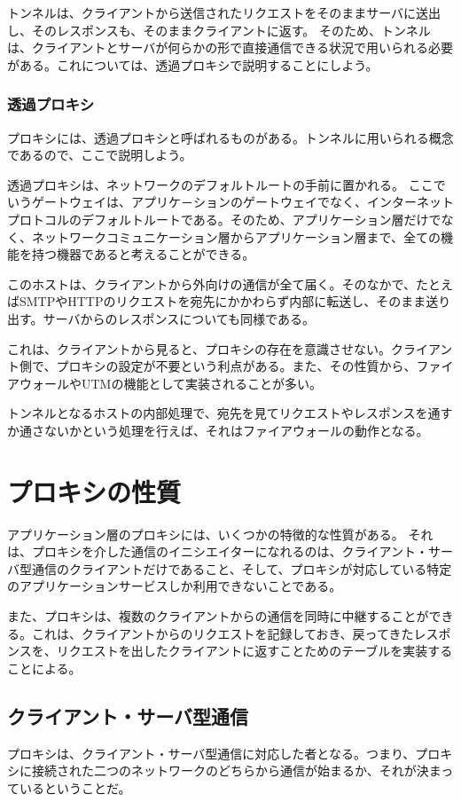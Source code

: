 トンネルは、クライアントから送信されたリクエストをそのままサーバに送出し、そのレスポンスも、そのままクライアントに返す。
そのため、トンネルは、クライアントとサーバが何らかの形で直接通信できる状況で用いられる必要がある。これについては、透過プロキシで説明することにしよう。

\subsubsection{透過プロキシ}
プロキシには、透過プロキシと呼ばれるものがある。トンネルに用いられる概念であるので、ここで説明しよう。

透過プロキシは、ネットワークのデフォルトルートの手前に置かれる。
ここでいうゲートウェイは、アプリケ－ションのゲートウェイでなく、インターネットプロトコルのデフォルトルートである。そのため、アプリケーション層だけでなく、ネットワークコミュニケーション層からアプリケーション層まで、全ての機能を持つ機器であると考えることができる。

このホストは、クライアントから外向けの通信が全て届く。そのなかで、たとえばSMTPやHTTPのリクエストを宛先にかかわらず内部に転送し、そのまま送り出す。サーバからのレスポンスについても同様である。

これは、クライアントから見ると、プロキシの存在を意識させない。クライアント側で、プロキシの設定が不要という利点がある。また、その性質から、ファイアウォールやUTMの機能として実装されることが多い。

トンネルとなるホストの内部処理で、宛先を見てリクエストやレスポンスを通すか通さないかという処理を行えば、それはファイアウォールの動作となる。

\section{プロキシの性質}
アプリケーション層のプロキシには、いくつかの特徴的な性質がある。
それは、プロキシを介した通信のイニシエイターになれるのは、クライアント・サーバ型通信のクライアントだけであること、そして、プロキシが対応している特定のアプリケーションサービスしか利用できないことである。

また、プロキシは、複数のクライアントからの通信を同時に中継することができる。これは、クライアントからのリクエストを記録しておき、戻ってきたレスポンスを、リクエストを出したクライアントに返すことためのテーブルを実装することによる。

\subsection{クライアント・サーバ型通信}
プロキシは、クライアント・サーバ型通信に対応した者となる。つまり、プロキシに接続された二つのネットワークのどちらから通信が始まるか、それが決まっているということだ。

